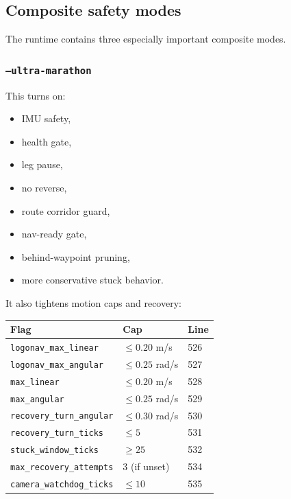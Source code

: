 \documentclass[11pt]{article}
\begin{document}
\subsection{Composite safety modes}

The runtime contains three especially important composite modes.

\subsubsection*{\texttt{--ultra-marathon}}

This turns on:

\begin{itemize}[nosep]
  \item IMU safety,
  \item health gate,
  \item leg pause,
  \item no reverse,
  \item route corridor guard,
  \item nav-ready gate,
  \item behind-waypoint pruning,
  \item more conservative stuck behavior.
\end{itemize}

It also tightens motion caps and recovery:

\begin{center}
\begin{tabular}{lll}
\toprule
\textbf{Flag} & \textbf{Cap} & \textbf{Line} \\
\midrule
\texttt{logonav\_max\_linear} & $\leq 0.20$ m/s & 526 \\
\texttt{logonav\_max\_angular} & $\leq 0.25$ rad/s & 527 \\
\texttt{max\_linear} & $\leq 0.20$ m/s & 528 \\
\texttt{max\_angular} & $\leq 0.25$ rad/s & 529 \\
\texttt{recovery\_turn\_angular} & $\leq 0.30$ rad/s & 530 \\
\texttt{recovery\_turn\_ticks} & $\leq 5$ & 531 \\
\texttt{stuck\_window\_ticks} & $\geq 25$ & 532 \\
\texttt{max\_recovery\_attempts} & 3 (if unset) & 534 \\
\texttt{camera\_watchdog\_ticks} & $\leq 10$ & 535 \\
\bottomrule
\end{tabular}
\end{center}
\end{document}

